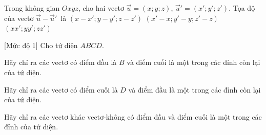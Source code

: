 \begin{ex}%
	Trong không  gian $Oxyz$, cho hai vectơ $\overrightarrow{u}=(x;y;z)$, $\overrightarrow{u}'=\left(x';y';z'\right)$. Tọa độ của vectơ $\overrightarrow{u}-\overrightarrow{u}'$~là
		{\True $\left(x-x'; y-y';  z-z'\right)$}
		{$\left(x'-x;  y'-y; z'-z\right)$}
		 {$\left(x x'; y y'; z z'\right)$}
\end{ex}

\begin{bt}%
[Mức độ 1]%
	Cho tứ diện $ABCD$.
 \begin{listEX}[1]
        \item  Hãy chỉ ra các vectơ có điểm đầu là $B$ và điểm cuối là một trong các đỉnh còn lại của tứ diện.
        \item  Hãy chỉ ra các vectơ có điểm cuối là $D$ và điểm đầu là một trong các đỉnh còn lại của tứ diện.
        \item  Hãy chỉ ra các vectơ khác vectơ-không có điểm đầu và điểm cuối là một trong các đỉnh của tứ diện.
 \end{listEX}
\end{bt}
